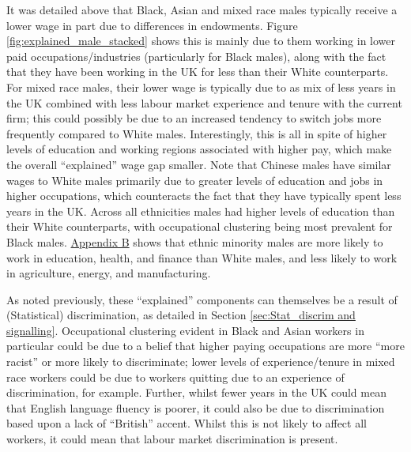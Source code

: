 \documentclass[class=article, crop=false]{standalone}
\begin{document}
It was detailed above that Black, Asian and mixed race males typically receive a lower wage in part due to differences in endowments. Figure \ref{fig:explained_male_stacked} shows this is mainly due to them working in lower paid occupations/industries (particularly for Black males), along with the fact that they have been working in the UK for less than their White counterparts. For mixed race males, their lower wage is typically due to as mix of less years in the UK combined with less labour market experience and tenure with the current firm; this could possibly be due to an increased tendency to switch jobs more frequently compared to White males. Interestingly, this is all in spite of higher levels of education and working regions associated with higher pay, which make the overall \enquote{explained} wage gap smaller. Note that Chinese males have similar wages to White males primarily due to greater levels of education and jobs in higher occupations, which counteracts the fact that they have typically spent less years in the UK. Across all ethnicities males had higher levels of education than their White counterparts, with occupational clustering being most prevalent for Black males. \hyperref[sec:appendixB]{Appendix B} shows that ethnic minority males are more likely to work in education, health, and finance than White males, and less likely to work in agriculture, energy, and manufacturing.

As noted previously, these \enquote{explained} components can themselves be a result of (Statistical) discrimination, as detailed in Section \ref{sec:Stat_discrim and signalling}. Occupational clustering evident in Black and Asian workers in particular could be due to a belief that higher paying occupations are more \enquote{more racist} or more likely to discriminate; lower levels of experience/tenure in mixed race workers could be due to workers quitting due to an experience of discrimination, for example. Further, whilst fewer years in the UK could mean that English language fluency is poorer, it could also be due to discrimination based upon a lack of \enquote{British} accent. Whilst this is not likely to affect all workers, it could mean that labour market discrimination is present. 
\end{document}
